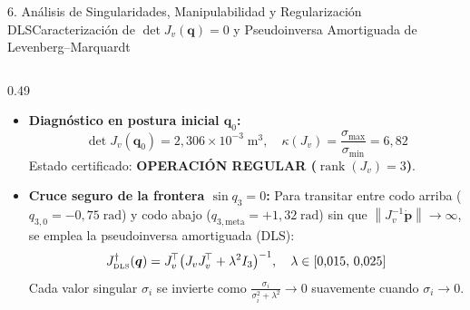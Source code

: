 \documentclass[aspectratio=169,10pt,xcolor=table]{beamer}
\newcommand{\T}{^{\!\top}}
\newcommand{\norm}[1]{\left\lVert#1\right\rVert}
\newcommand{\pdot}{\dot{\bm{p}}}
\newcommand{\Jdls}{J^{\dagger}_{\text{\tiny DLS}}}
\begin{document}
\begin{frame}{6. Análisis de Singularidades, Manipulabilidad y Regularización DLS}{Caracterización de $\det J_v(\bm{q})=0$ y Pseudoinversa Amortiguada de Levenberg--Marquardt}
\begin{columns}[T,totalwidth=\textwidth]
  \begin{column}{0.49\textwidth}
    \begin{cajaidea}
      \fontsize{6.7}{8.1}\selectfont
      \begin{itemize}\setlength{\itemsep}{1.5pt}
        \item \textbf{Diagnóstico en postura inicial $\bm{q}_0$:}
        \[
        \det J_v(\bm{q}_0) = 2{,}306\times 10^{-3}\;\text{m}^3,\quad \kappa(J_v) = \frac{\sigma_{\max}}{\sigma_{\min}} = 6{,}82
        \]
        Estado certificado: \textbf{\color{verdeOk}OPERACIÓN REGULAR ($\operatorname{rank}(J_v)=3$)}.
        \item \textbf{Cruce seguro de la frontera $\sin q_3 = 0$:} Para transitar entre codo arriba ($q_{3,0}=-0{,}75\;\text{rad}$) y codo abajo ($q_{3,\text{meta}}=+1{,}32\;\text{rad}$) sin que $\norm{J_v^{-1}\pdot}\to\infty$, se emplea la pseudoinversa amortiguada (DLS):
        \[
        \Jdls(\bm{q}) = J_v\T\bigl(J_v J_v\T + \lambda^2 I_3\bigr)^{-1},\quad \lambda\in[0{,}015,\,0{,}025]
        \]
        Cada valor singular $\sigma_i$ se invierte como $\frac{\sigma_i}{\sigma_i^2+\lambda^2}\to 0$ suavemente cuando $\sigma_i\to 0$.
      \end{itemize}
    \end{cajaidea}
  \end{column}
\end{columns}
\end{frame}
\end{document}
